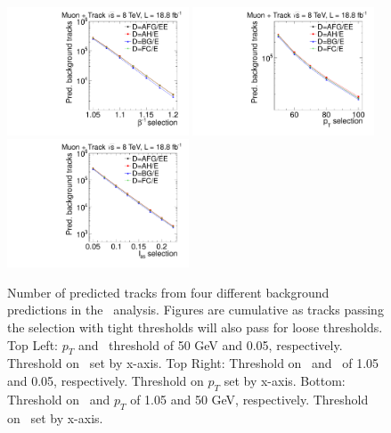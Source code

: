 \begin{figure}
 \begin{center}
  \includegraphics[clip=false, trim=0.0cm 0cm 0.0cm 0cm, width=0.48\textwidth]{figures/tkmu/Systematics_Data8TeV_TOF_Value}
  \includegraphics[clip=false, trim=0.0cm 0cm 0.0cm 0cm, width=0.48\textwidth]{figures/tkmu/Systematics_Data8TeV_P_Value} \\
  \includegraphics[clip=false, trim=0.0cm 0cm 0.0cm 0cm, width=0.48\textwidth]{figures/tkmu/Systematics_Data8TeV_I_Value}
 \end{center}
 \caption[Number of predicted tracks from four different background predictions in the \tktof\ analysis]
{Number of predicted tracks from four different background predictions in the \tktof\ analysis. 
Figures are cumulative as tracks passing the selection with tight thresholds will also pass for loose thresholds.
Top Left: $p_T$ and \ias\ threshold of 50 GeV and 0.05, respectively.
Threshold on \invbeta\ set by x-axis. Top Right: Threshold on \invbeta\  and \ias\ of 1.05 and 0.05, respectively. Threshold on $p_T$ set by x-axis.
Bottom: Threshold on \invbeta\ and $p_T$ of 1.05 and 50 GeV, respectively. Threshold on \ias\ set by x-axis. }
\label{fig:TkMuMultPred}
\end{figure}

